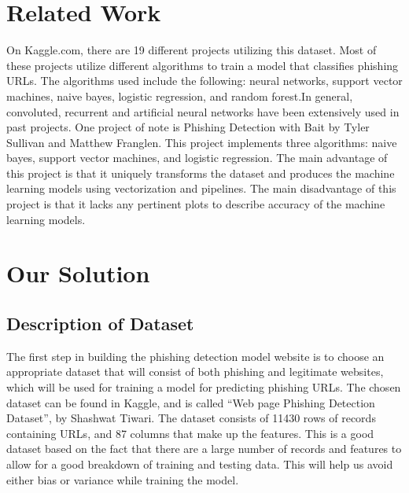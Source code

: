 \documentclass[conference]{IEEEtran}
\begin{document}
\section{Related Work}
On Kaggle.com, there are 19 different projects utilizing this dataset. Most of these projects utilize different algorithms to train a model that classifies phishing URLs. The algorithms  used include the following: neural networks, support vector machines, naive bayes, logistic regression, and random forest.In general, convoluted, recurrent and artificial neural networks have been extensively used in past projects. One project of note is Phishing Detection with Bait by Tyler Sullivan and Matthew Franglen. This project implements three algorithms: naive bayes, support vector machines, and logistic regression. The main advantage of this project is that it uniquely transforms the dataset and produces the machine learning models using vectorization and pipelines. The main disadvantage of this project is that it lacks any pertinent plots to describe accuracy of  the machine learning models.   

\section{Our Solution}

\subsection{Description of Dataset}
The first step in building the phishing detection model website is to choose an appropriate dataset that will consist of both phishing and legitimate websites, which will be used for training a model for predicting phishing URLs. The chosen dataset can be found in Kaggle, and is called  “Web page Phishing Detection Dataset”, by Shashwat Tiwari. The dataset consists of 11430 rows of records containing URLs, and 87 columns that make up the features. This is a good dataset based on the fact that there are a large number of records and features to allow for a good breakdown of training and testing data. This will help us avoid either bias or variance while training the model. 
\end{document}

